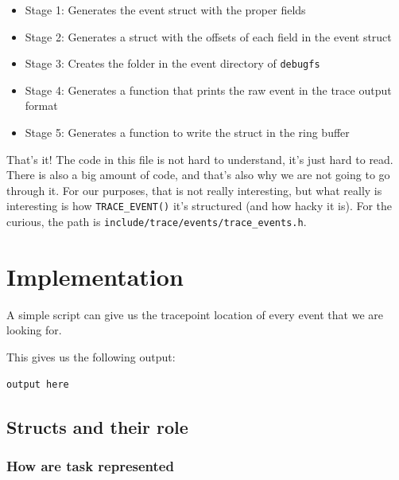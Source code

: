 \documentclass[10pt, oneside]{book}
\begin{document}
\begin{itemize}
    \item Stage 1: Generates the event struct with the proper fields
    \item Stage 2: Generates a struct with the offsets of each field in the event struct
    \item Stage 3: Creates the folder in the event directory of \verb|debugfs|
    \item Stage 4: Generates a function that prints the raw event in the trace output format
    \item Stage 5: Generates a function to write the struct in the ring buffer
\end{itemize}
That's it! The code in this file is not hard to understand, it's just hard to read. There is also a big amount of code, and that's also why we are not going to go through it. For our purposes, that is not really interesting, but what really is interesting is how \verb|TRACE_EVENT()| it's structured (and how hacky it is). For the curious, the path is \verb|include/trace/events/trace_events.h|.
\chapter{Implementation}
\label{chap:implementation}
A simple script can give us the tracepoint location of every event that we are looking for.
This gives us the following output:
\begin{Verbatim}
output here
\end{Verbatim}

\section{Structs and their role}

\subsection{How are task represented}
\end{document}
